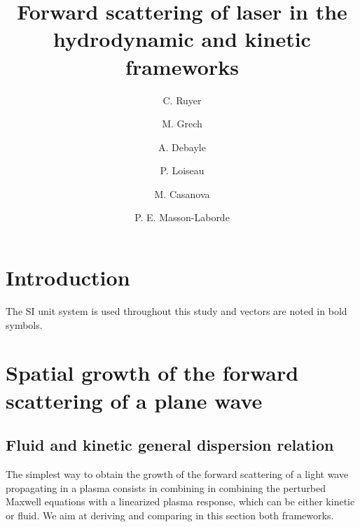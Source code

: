 \documentclass[
 reprint,
 amsmath,amssymb,
 aps,
]{revtex4-1}
\begin{document}
\title{ 
Forward scattering of  laser in the hydrodynamic and kinetic frameworks }
\author{C. Ruyer}
\author{M. Grech}
\author{A. Debayle}
\author{P. Loiseau}
\author{M. Casanova}
\author{P. E. Masson-Laborde}

\begin{abstract}
 
\end{abstract}

\maketitle

\section{Introduction}
The SI unit system is used throughout this study and vectors are noted in bold symbols. 

\section{Spatial growth of the  forward scattering of a plane wave}\label{sec:plane}
\subsection{Fluid and kinetic general dispersion relation}
The simplest way to obtain the growth of the forward scattering of a light wave propagating in a plasma consists in combining in combining the perturbed Maxwell equations with a linearized plasma response, which can be either kinetic or fluid.
We aim at deriving and comparing in this section both frameworks.
\end{document}
